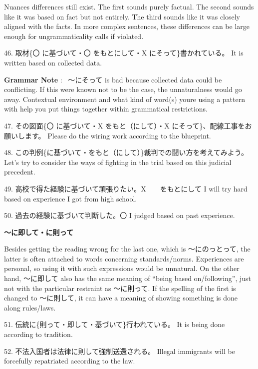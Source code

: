 \par{Nuances differences still exist. The first sounds purely factual. The second sounds like it was based on fact but not entirely. The third sounds like it was closely aligned with the facts. In more complex sentences, these differences can be large enough for ungrammaticality calls if violated. }
 
\par{46. 取材\{〇 に基づいて・〇 をもとにして・X にそって\}書かれている。 \hfill\break
It is written based on collected data. }
 
\par{\textbf{Grammar Note }:  ～にそって is bad because collected data could be conflicting. If this were known not to be the case, the unnaturalness would go away. Contextual environment and what kind of word(s) you\textquotesingle re using a pattern with help you put things together within grammatical restrictions. }

\par{47. その図面\{〇 に基づいて・X をもと（にして）・X にそって\}、配線工事をお願いします。 \hfill\break
Please do the wiring work according to the blueprint. }

\par{48. この判例\{に基づいて・をもと（にして）\}裁判での闘い方を考えてみよう。 \hfill\break
Let's try to consider the ways of fighting in the trial based on this judicial precedent. }
 
\par{49. 高校で得た経験に基づいて頑張りたい。X　　\textrightarrow  をもとにして \hfill\break
I will try hard based on experience I got from high school. }

\par{50. 過去の経験に基づいて判断した。〇 \hfill\break
I judged based on past experience. }
 
\par{\textbf{～に即して・に則って }}
 
\par{ Besides getting the reading wrong for the last one, which is ～にのっとって, the latter is often attached to words concerning standards\slash norms. Experiences are personal, so using it with such expressions would be unnatural. On the other hand, ～に即して also has the same meaning of “being based on\slash following”, just not with the particular restraint as ～に則って. If the spelling of the first is changed to ～に則して, it can have a meaning of showing something is done along rules\slash laws. }
 
\par{51. 伝統に\{則って・即して・基づいて\}行われている。 \hfill\break
It is being done according to tradition. }
 
\par{52. 不法入国者は法律に則して強制送還される。 \hfill\break
Illegal immigrants will be forcefully repatriated according to the law. }
    